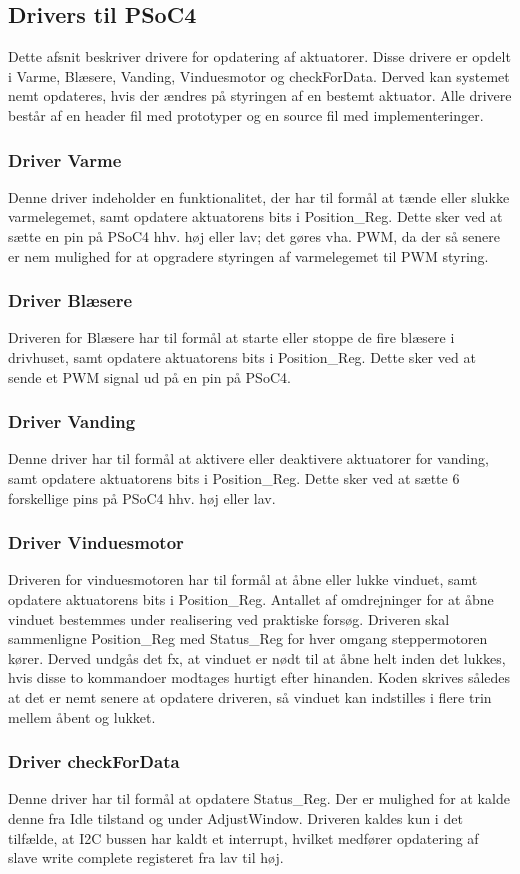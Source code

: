 \subsection{Drivers til PSoC4}
Dette afsnit beskriver drivere for opdatering af aktuatorer. 
Disse drivere er opdelt i Varme, Blæsere, Vanding, Vinduesmotor og checkForData. 
Derved kan systemet nemt opdateres, hvis der ændres på styringen af en bestemt aktuator. 
Alle drivere består af en header fil med prototyper og en source fil med implementeringer.

\subsubsection{Driver Varme}
Denne driver indeholder en funktionalitet, der har til formål at tænde eller slukke varmelegemet, samt opdatere aktuatorens bits i Position\_Reg. 
Dette sker ved at sætte en pin på PSoC4 hhv. høj eller lav; det gøres vha. PWM, da der så senere er nem mulighed for at opgradere styringen af varmelegemet til PWM styring. 

\subsubsection{Driver Blæsere}
Driveren for Blæsere har til formål at starte eller stoppe de fire blæsere i drivhuset, samt opdatere aktuatorens bits i Position\_Reg.
Dette sker ved at sende et PWM signal ud på en pin på PSoC4. 

\subsubsection{Driver Vanding}
Denne driver har til formål at aktivere eller deaktivere aktuatorer for vanding, samt opdatere aktuatorens bits i Position\_Reg. 
Dette sker ved at sætte 6 forskellige pins på PSoC4 hhv. høj eller lav. 

\subsubsection{Driver Vinduesmotor}
Driveren for vinduesmotoren har til formål at åbne eller lukke vinduet, samt opdatere aktuatorens bits i Position\_Reg. 
Antallet af omdrejninger for at åbne vinduet bestemmes under realisering ved praktiske forsøg. 
Driveren skal sammenligne Position\_Reg med Status\_Reg for hver omgang steppermotoren kører. 
Derved undgås det fx, at vinduet er nødt til at åbne helt inden det lukkes, hvis disse to kommandoer modtages hurtigt efter hinanden. 
Koden skrives således at det er nemt senere at opdatere driveren, så vinduet kan indstilles i flere trin mellem åbent og lukket. 

\subsubsection{Driver checkForData}
Denne driver har til formål at opdatere Status\_Reg. Der er mulighed for at kalde denne fra Idle tilstand og under AdjustWindow.
Driveren kaldes kun i det tilfælde, at I2C bussen har kaldt et interrupt, hvilket medfører opdatering af slave write complete registeret fra lav til høj.

\clearpage